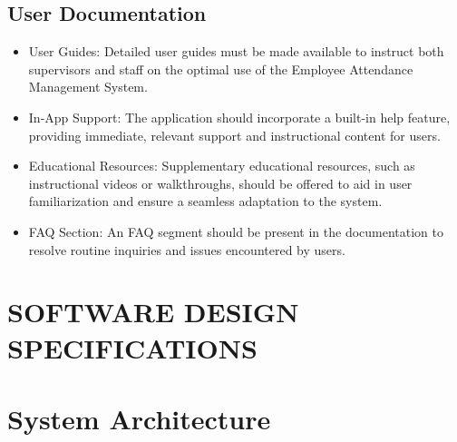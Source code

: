 \documentclass[a4paper, 12pt]{article}
\begin{document}
\subsection{User Documentation}
\begin{itemize}
    \item User Guides: Detailed user guides must be made available to instruct both supervisors and staff on the optimal use of the Employee Attendance Management System.
    \item In-App Support: The application should incorporate a built-in help feature, providing immediate, relevant support and instructional content for users.
    \item Educational Resources: Supplementary educational resources, such as instructional videos or walkthroughs, should be offered to aid in user familiarization and ensure a seamless adaptation to the system.
    \item FAQ Section: An FAQ segment should be present in the documentation to resolve routine inquiries and issues encountered by users.
\end{itemize}

\newpage
\section*{\centering SOFTWARE DESIGN SPECIFICATIONS}

\section{System Architecture}
\end{document}
